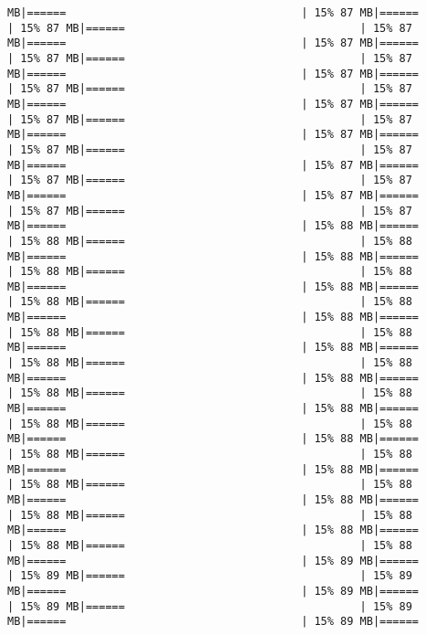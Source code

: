 \documentclass[
]{article}
\begin{document}
\begin{verbatim}
MB|======                                    | 15% 87 MB|======                                    | 15% 87 MB|======                                    | 15% 87 MB|======                                    | 15% 87 MB|======                                    | 15% 87 MB|======                                    | 15% 87 MB|======                                    | 15% 87 MB|======                                    | 15% 87 MB|======                                    | 15% 87 MB|======                                    | 15% 87 MB|======                                    | 15% 87 MB|======                                    | 15% 87 MB|======                                    | 15% 87 MB|======                                    | 15% 87 MB|======                                    | 15% 87 MB|======                                    | 15% 87 MB|======                                    | 15% 87 MB|======                                    | 15% 87 MB|======                                    | 15% 87 MB|======                                    | 15% 87 MB|======                                    | 15% 87 MB|======                                    | 15% 88 MB|======                                    | 15% 88 MB|======                                    | 15% 88 MB|======                                    | 15% 88 MB|======                                    | 15% 88 MB|======                                    | 15% 88 MB|======                                    | 15% 88 MB|======                                    | 15% 88 MB|======                                    | 15% 88 MB|======                                    | 15% 88 MB|======                                    | 15% 88 MB|======                                    | 15% 88 MB|======                                    | 15% 88 MB|======                                    | 15% 88 MB|======                                    | 15% 88 MB|======                                    | 15% 88 MB|======                                    | 15% 88 MB|======                                    | 15% 88 MB|======                                    | 15% 88 MB|======                                    | 15% 88 MB|======                                    | 15% 88 MB|======                                    | 15% 88 MB|======                                    | 15% 88 MB|======                                    | 15% 88 MB|======                                    | 15% 88 MB|======                                    | 15% 88 MB|======                                    | 15% 88 MB|======                                    | 15% 88 MB|======                                    | 15% 88 MB|======                                    | 15% 88 MB|======                                    | 15% 88 MB|======                                    | 15% 88 MB|======                                    | 15% 88 MB|======                                    | 15% 89 MB|======                                    | 15% 89 MB|======                                    | 15% 89 MB|======                                    | 15% 89 MB|======                                    | 15% 89 MB|======                                    | 15% 89 MB|======                                    | 15% 89 MB|======                
\end{verbatim}
\end{document}
